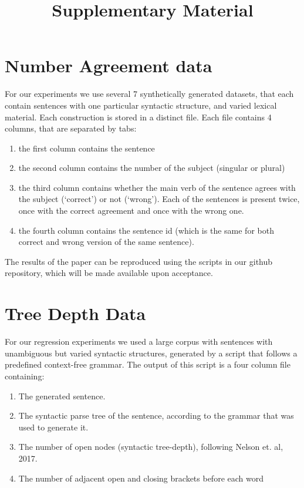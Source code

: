 \documentclass{article}
\title{Supplementary Material}
\date{}
\author{}
\begin{document}
\maketitle

\section*{Number Agreement data}

For our experiments we use several 7 synthetically generated datasets, that each contain sentences with one particular syntactic structure, and varied lexical material.
Each construction is stored in a distinct file.
Each file contains 4 columns, that are separated by tabs:\begin{enumerate}
    \item the first column contains the sentence
    \item the second column  contains the number of the subject (singular or plural)
    \item the third column contains whether the main verb of the sentence agrees with the subject (`correct') or not (`wrong'). Each of the sentences is present twice, once with the correct agreement and once with the wrong one.
    \item the fourth column contains the sentence id (which is the same for both correct and wrong version of the same sentence).
\end{enumerate}

The results of the paper can be reproduced using the scripts in our github repository, which will be made available upon acceptance.

\section*{Tree Depth Data}

For our regression experiments we used a large corpus with sentences with unambiguous but varied syntactic structures, generated by a script that follows a predefined context-free grammar.
The output of this script is a four column file containing:\begin{enumerate}
    \item The generated sentence.
    \item The syntactic parse tree of the sentence, according to the grammar that was used to generate it.
    \item The number of open nodes (syntactic tree-depth), following Nelson et. al, 2017.
    \item The number of adjacent open and closing brackets before each word
\end{enumerate}
\end{document}
